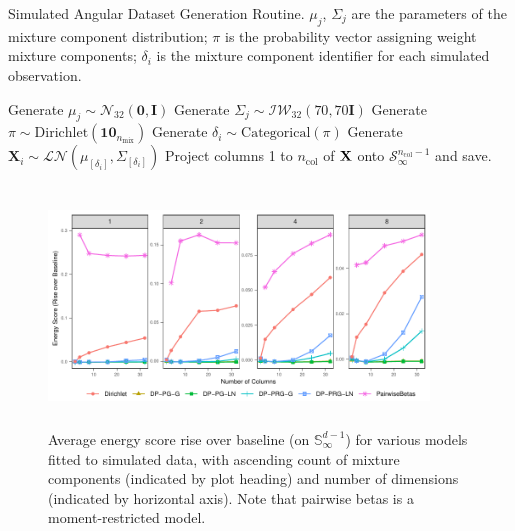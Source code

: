 \begin{algorithm} %
        \caption{Simulated Angular Dataset Generation Routine\label{algo:simulated}.
        $\mu_j$, $\Sigma_j$ are the parameters of the mixture component distribution; 
        $\pi$ is the probability vector assigning weight mixture components; $\delta_i$ 
        is the mixture component identifier for each simulated observation.}
        \begin{algorithmic}
                \State Generate $\mu_{j} \sim \mathcal{N}_{32}\left(\bm{0},\bm{I}\right)$
                \State Generate $\Sigma_{j}\sim\mathcal{IW}_{32}\left(70,70 \bm{I}\right)$
            \EndFor
            \State Generate $\pi\sim\text{Dirichlet}(\bm{10}_{n_{\text{mix}}})$
                \State Generate $\delta_i \sim \text{Categorical}(\pi)$
                \State Generate $\bm{X}_i \sim \mathcal{LN}\left(\mu_{[\delta_i]},\Sigma_{[\delta_i]}\right)$
            \EndFor
                \State Project columns 1 to $n_{\text{col}}$ of ${\bf X}$ onto $\mathcal{S}_{\infty}^{n_{\text{col}} - 1}$ and save.
            \EndFor
        \EndFor
        \EndFor
        \end{algorithmic}
    \end{algorithm}

\begin{figure}[t]
    \centering
    \includegraphics[height=2.5in, width = 0.9\textwidth]{./images/sim_es_rise}
    \caption{Average energy score rise over baseline (on $\mathbb{S}_{\infty}^{d-1}$) for various 
    models fitted to simulated data, with ascending count of mixture components (indicated by plot
    heading) and number of dimensions (indicated by horizontal axis).  Note that pairwise betas is
    a moment-restricted model.\label{fig:simpples}}
\end{figure}


